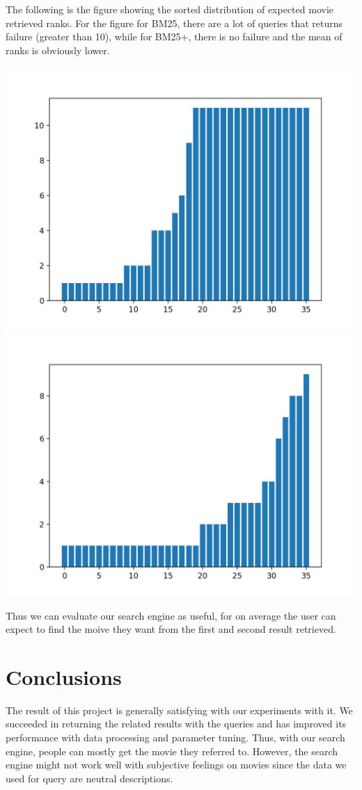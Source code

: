 \documentclass[letterpaper,10pt]{article}
\newenvironment{Figure}
  {\par\medskip\noindent\minipage{\linewidth}}
  {\endminipage\par\medskip}
\begin{document}
\begin{multicols}{2}
    The following is the figure showing the sorted distribution of expected movie retrieved ranks.
    For the figure for BM25, there are a lot of queries that returns failure (greater than 10), 
    while for BM25+, there is no failure and the mean of ranks is obviously lower. 

    \begin{Figure}
        \center
        \includegraphics[width=0.47\linewidth]{evaluation_1.png}
        \includegraphics[width=0.47\linewidth]{evaluation_2.png}
    \end{Figure}

    Thus we can evaluate our search engine as useful, for on average the user
    can expect to find the moive they want from the first and second result
    retrieved.

    \section{Conclusions}

    The result of this project is generally satisfying with our experiments with
    it. We succeeded in returning the related results with the queries and has
    improved its performance with data processing and parameter tuning. Thus,
    with our search engine, people can mostly get the movie they referred to.
    However, the search engine might not work well with subjective feelings on
    movies since the data we used for query are neutral descriptions.


\end{multicols}
\end{document}
